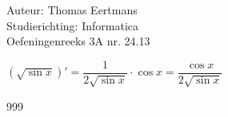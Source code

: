 \documentclass[a4paper]{article}
\begin{document}
  
\noindent \large Auteur: Thomas Eertmans \\
\noindent \large Studierichting: Informatica\\
\noindent \large Oefeningenreeks 3A nr. 24.13\\

\medskip

\normalsize

$\left(\sqrt{\sin x}\right)' = \dfrac{1}{2\sqrt{\sin x}} \cdot \cos x = \dfrac{\cos x}{2\sqrt{\sin x}}$

\begin{thebibliography}{999}
\end{thebibliography}
\end{document}
